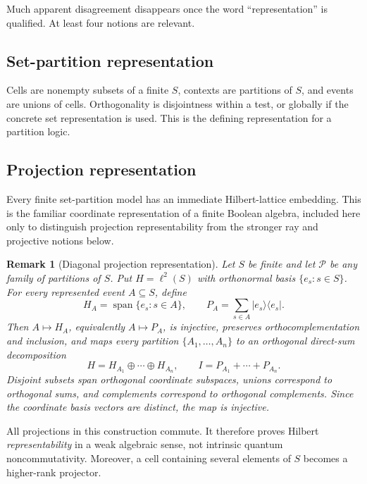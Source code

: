 \documentclass[
  aps,
  pra,
  twocolumn,
  amsmath,
  amssymb,
  longbibliography,
  nofootinbib,
  floatfix
]{revtex4-2}
\newtheorem{remark}{Remark}
\newcommand{\cP}{\mathcal P}
\newcommand{\Span}{\operatorname{span}}
\begin{document}
Much apparent disagreement disappears once the word ``representation'' is
qualified.  At least four notions are relevant.

\subsection{Set-partition representation}

Cells are nonempty subsets of a finite $S$, contexts are partitions of $S$, and
events are unions of cells.  Orthogonality is disjointness within a test, or
globally if the concrete set representation is used.  This is the defining
representation for a partition logic.

\subsection{Projection representation}

Every finite set-partition model has an immediate Hilbert-lattice embedding.
This is the familiar coordinate representation of a finite Boolean algebra,
included here only to distinguish projection representability from the
stronger ray and projective notions below.

\begin{remark}[Diagonal projection representation]
Let $S$ be finite and let $\cP$ be any family of partitions of $S$.  Put
$H=\ell^2(S)$ with orthonormal basis $\{e_s:s\in S\}$.  For every represented
event $A\subseteq S$, define
\begin{equation}
  H_A=\Span\{e_s:s\in A\},\qquad
  P_A=\sum_{s\in A}|e_s\rangle\langle e_s|.
  \label{eq:diagonal-projection}
\end{equation}
Then $A\mapsto H_A$, equivalently $A\mapsto P_A$, is injective, preserves
orthocomplementation and inclusion, and maps every partition
$\{A_1,\ldots,A_n\}$ to an orthogonal direct-sum decomposition
\begin{equation}
  H=H_{A_1}\oplus\cdots\oplus H_{A_n},
  \qquad
  I=P_{A_1}+\cdots+P_{A_n}.
  \label{eq:pvm-partition}
\end{equation}
Disjoint subsets span orthogonal coordinate subspaces, unions correspond to
orthogonal sums, and complements correspond to orthogonal complements.  Since
the coordinate basis vectors are distinct, the map is injective.
\end{remark}

All projections in this construction commute.  It therefore proves Hilbert
\emph{representability} in a weak algebraic sense, not intrinsic quantum
noncommutativity.  Moreover, a cell containing several elements of $S$ becomes
a higher-rank projector.
\end{document}

